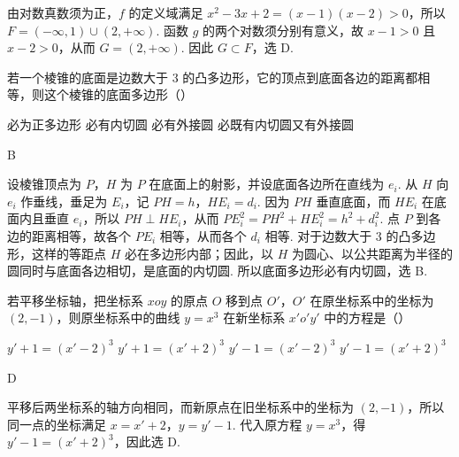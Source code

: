 \documentclass[UTF8,a4paper,oneside,11pt]{ctexbook}
\begin{document}
\begin{solution}
由对数真数须为正，\(f\) 的定义域满足 \(x^2-3x+2=(x-1)(x-2)>0\)，所以 \(F=\left(-\infty,1\right)\cup\left(2,+\infty\right)\). 函数 \(g\) 的两个对数须分别有意义，故 \(x-1>0\) 且 \(x-2>0\)，从而 \(G=\left(2,+\infty\right)\). 因此 \(G\subset F\)，选 D.
\end{solution}

\begin{problem}

若一个棱锥的底面是边数大于 \(3\) 的凸多边形，它的顶点到底面各边的距离都相等，则这个棱锥的底面多边形（\quad）

\choices
    {必为正多边形}
    {必有内切圆}
    {必有外接圆}
    {必既有内切圆又有外接圆}

\begin{answer}
B
\end{answer}
\end{problem}

\begin{solution}
设棱锥顶点为 \(P\)，\(H\) 为 \(P\) 在底面上的射影，并设底面各边所在直线为 \(e_i\). 从 \(H\) 向 \(e_i\) 作垂线，垂足为 \(E_i\)，记 \(PH=h\)，\(HE_i=d_i\). 因为 \(PH\) 垂直底面，而 \(HE_i\) 在底面内且垂直 \(e_i\)，所以 \(PH\perp HE_i\)，从而 \(PE_i^2=PH^2+HE_i^2=h^2+d_i^2\). 点 \(P\) 到各边的距离相等，故各个 \(PE_i\) 相等，从而各个 \(d_i\) 相等. 对于边数大于 \(3\) 的凸多边形，这样的等距点 \(H\) 必在多边形内部；因此，以 \(H\) 为圆心、以公共距离为半径的圆同时与底面各边相切，是底面的内切圆. 所以底面多边形必有内切圆，选 B.
\end{solution}

\begin{problem}

若平移坐标轴，把坐标系 \(xoy\) 的原点 \(O\) 移到点 \(O'\)，\(O'\) 在原坐标系中的坐标为 \((2,-1)\)，则原坐标系中的曲线 \(y=x^3\) 在新坐标系 \(x'o'y'\) 中的方程是（\quad）

\choices
    {\(y'+1=\left(x'-2\right)^3\)}
    {\(y'+1=\left(x'+2\right)^3\)}
    {\(y'-1=\left(x'-2\right)^3\)}
    {\(y'-1=\left(x'+2\right)^3\)}

\begin{answer}
D
\end{answer}
\end{problem}

\begin{solution}
平移后两坐标系的轴方向相同，而新原点在旧坐标系中的坐标为 \((2,-1)\)，所以同一点的坐标满足 \(x=x'+2\)，\(y=y'-1\). 代入原方程 \(y=x^3\)，得 \(y'-1=\left(x'+2\right)^3\)，因此选 D.
\end{solution}
\end{document}
